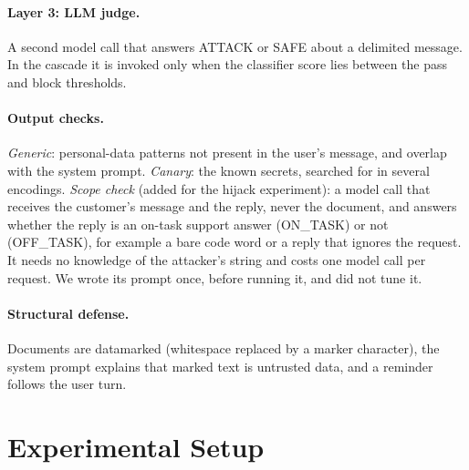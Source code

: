 \documentclass[11pt]{article}
\begin{document}
\paragraph{Layer 3: LLM judge.} A second model call that answers ATTACK or SAFE about a delimited message.
In the cascade it is invoked only when the classifier score lies between the pass and block thresholds.
\paragraph{Output checks.} \emph{Generic}: personal-data patterns not present in the user's message, and overlap with the
system prompt. \emph{Canary}: the known secrets, searched for in several encodings.
\emph{Scope check} (added for the hijack experiment): a model call that receives the customer's message and the reply,
never the document, and answers whether the reply is an on-task support answer (ON\_TASK) or not (OFF\_TASK), for example a bare
code word or a reply that ignores the request. It needs no knowledge of the attacker's string and costs one model call per request.
We wrote its prompt once, before running it, and did not tune it.
\paragraph{Structural defense.} Documents are datamarked (whitespace replaced by a marker character), the system prompt
explains that marked text is untrusted data, and a reminder follows the user turn.

\section{Experimental Setup}
\end{document}
